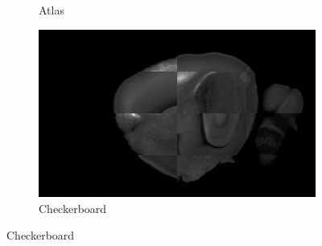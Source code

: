 \documentclass[8pt]{beamer}
\begin{document}
\begin{frame}
\begin{itemize}
\begin{figure}
\begin{subfigure}{0.30\textwidth}
      \caption{Atlas}
     \end{subfigure}
     \begin{subfigure}{0.30\textwidth}
      \includegraphics[width=\textwidth]{checker.png}
      \caption{Checkerboard}
     \end{subfigure}
    \end{figure}
  \end{itemize}
 \end{frame}
\end{document}
